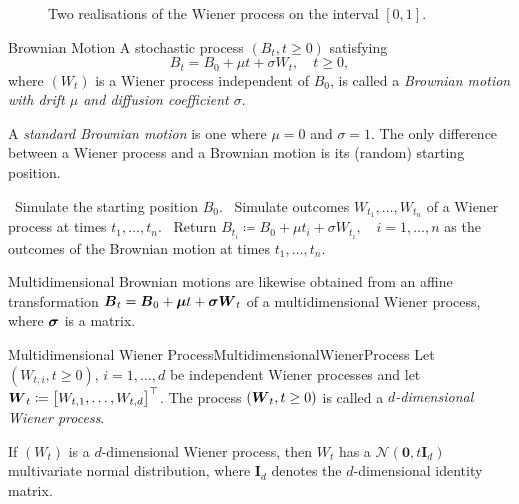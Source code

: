 \begin{figure}[H]
	\centering
	
	\caption{Two realisations of the Wiener process on the interval \({[0,1]}\).}\label{fig:twoRealisations.pgf}
\end{figure}

\begin{defn}{Brownian Motion}{}
	A stochastic process \((B_t, t \ge 0)\) satisfying
	\begin{equation*}
		B_t = B_0 + \mu t + \sigma W_t, \quad t \ge 0,
	\end{equation*}
	where \((W_t)\) is a Wiener process independent of \(B_0\), is called a \textit{Brownian motion with drift \(\mu\) and diffusion coefficient \(\sigma\)}.
\end{defn}

A \textit{standard Brownian motion} is one where \(\mu = 0\) and \(\sigma = 1\). The only difference between a Wiener process and a Brownian motion is its (random) starting position.

\begin{algorithm}[H]
	\caption{Simulating a Brownian Motion}\label{alg:SimulatingBrownianMotion}
	\begin{algorithmic}[1]
		\State~Simulate the starting position \(B_0\).
		\State~Simulate outcomes \(W_{t_1}, \ldots, W_{t_n}\) of a Wiener process at times \(t_1, \ldots, t_n\).
		\State~Return \(B_{t_i} \coloneqq B_0 + \mu t_i + \sigma W_{t_i}, \quad i = 1, \ldots, n\) as the outcomes of the Brownian motion at times \(t_1, \ldots, t_n\).
	\end{algorithmic}
\end{algorithm}

Multidimensional Brownian motions are likewise obtained from an affine transformation \(\boldsymbol{B}_t = \boldsymbol{B}_0 + \boldsymbol{\mu} t + \boldsymbol{\sigma} \boldsymbol{W}_t\) of a multidimensional Wiener process, where \(\boldsymbol{\sigma}\) is a matrix.

\begin{defn}{Multidimensional Wiener Process}{MultidimensionalWienerProcess}
	Let \((W_{t,i}, t \ge 0)\), \(i = 1, \ldots, d\) be independent Wiener processes and let \(\boldsymbol{W}_t \coloneqq {\bigl[W_{t,1}, \ldots, W_{t,d}\bigr]}^{\top}\). The process \({(\boldsymbol{W}_t, t \ge 0)}\) is called a \textit{\(d\)-dimensional Wiener process}.
\end{defn}

If \((W_t)\) is a \(d\)-dimensional Wiener process, then \(W_t\) has a \(\mathcal{N}(\mathbf{0}, t \mathbf{I}_d)\) multivariate normal distribution, where \(\mathbf{I}_d\) denotes the \(d\)-dimensional identity matrix.

